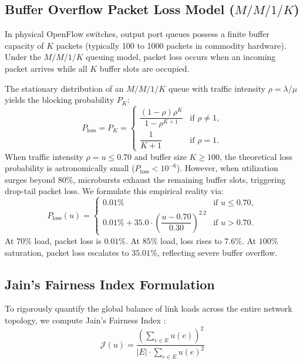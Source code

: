 \subsection{Buffer Overflow Packet Loss Model ($M/M/1/K$)}
In physical OpenFlow switches, output port queues possess a finite buffer capacity of $K$ packets (typically 100 to 1000 packets in commodity hardware). Under the $M/M/1/K$ queuing model, packet loss occurs when an incoming packet arrives while all $K$ buffer slots are occupied.

The stationary distribution of an $M/M/1/K$ queue with traffic intensity $\rho = \lambda / \mu$ yields the blocking probability $P_K$:
\begin{equation}
    P_{\text{loss}} = P_K = \begin{cases} \dfrac{(1 - \rho)\rho^K}{1 - \rho^{K+1}} & \text{if } \rho \neq 1, \\[2mm] \dfrac{1}{K+1} & \text{if } \rho = 1. \end{cases}
    \label{eq:mm1k_loss}
\end{equation}
When traffic intensity $\rho = u \le 0.70$ and buffer size $K \ge 100$, the theoretical loss probability is astronomically small ($P_{\text{loss}} < 10^{-6}$). However, when utilization surges beyond $80\%$, microbursts exhaust the remaining buffer slots, triggering drop-tail packet loss. We formulate this empirical reality via:
\begin{equation}
    P_{\text{loss}}(u) = \begin{cases}
        0.01\% & \text{if } u \le 0.70, \\[0.5em]
        0.01\% + 35.0 \cdot \left( \dfrac{u - 0.70}{0.30} \right)^{2.2} & \text{if } u > 0.70.
    \end{cases}
    \label{eq:packet_loss_model}
\end{equation}
At $70\%$ load, packet loss is $0.01\%$. At $85\%$ load, loss rises to $7.6\%$. At $100\%$ saturation, packet loss escalates to $35.01\%$, reflecting severe buffer overflow.

\subsection{Jain's Fairness Index Formulation}
To rigorously quantify the global balance of link loads across the entire network topology, we compute Jain's Fairness Index \cite{jain1984quantitative}:
\begin{equation}
    \mathcal{J}(u) = \frac{\left( \sum_{e \in E} u(e) \right)^2}{|E| \cdot \sum_{e \in E} u(e)^2}
    \label{eq:jains_fairness_formula}
\end{equation}

